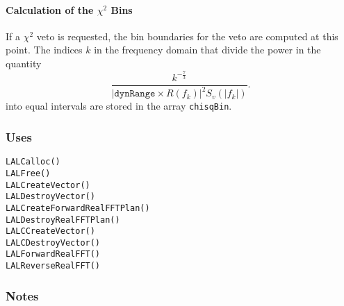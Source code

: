 \paragraph*{Calculation of the $\chi^2$ Bins}

If a $\chi^2$ veto is requested, the bin boundaries for the veto are computed
at this point. The indices $k$ in the frequency domain that divide the power
in the quantity
\begin{equation}
\frac{k^{-\frac{7}{3}}}
{\left|\mathtt{dynRange}\times R(f_k)\right|^2 S_v(|f_k|)}.
\end{equation}
into equal intervals are stored in the array \texttt{chisqBin}.

\subsubsection*{Uses}
\begin{verbatim}
LALCalloc()
LALFree()
LALCreateVector()
LALDestroyVector()
LALCreateForwardRealFFTPlan()
LALDestroyRealFFTPlan()
LALCCreateVector()
LALCDestroyVector()
LALForwardRealFFT()
LALReverseRealFFT()
\end{verbatim}

\subsubsection*{Notes}

